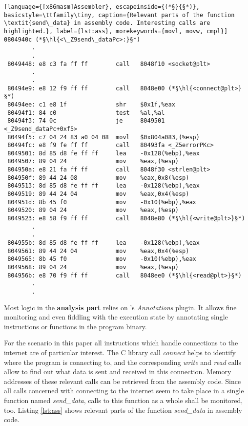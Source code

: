 \bigskip
\begin{lstlisting}[language={[x86masm]Assembler}, escapeinside={(*§}{§*)}, basicstyle=\ttfamily\tiny, caption={Relevant parts of the function \textit{send\_data} in assembly code. Interesting calls are highlighted.}, label={lst:ass}, morekeywords={movl, movw, cmpl}]
0804940c (*§\hl{<\_Z9send\_dataPc>:}§*)
 		.
 		.
 8049448: e8 c3 fa ff ff       	call   8048f10 <socket@plt>
		.
		.
 80494e9: e8 12 f9 ff ff       	call   8048e00 (*§\hl{<connect@plt>}§*)
 80494ee: c1 e8 1f             	shr    $0x1f,%eax
 80494f1: 84 c0                	test   %al,%al
 80494f3: 74 0c                	je     8049501						<_Z9send_dataPc+0xf5>
 80494f5: c7 04 24 83 a0 04 08 	movl   $0x804a083,(%esp)
 80494fc: e8 f9 fe ff ff       	call   80493fa <_Z5errorPKc>
 8049501: 8d 85 d8 fe ff ff    	lea    -0x128(%ebp),%eax
 8049507: 89 04 24             	mov    %eax,(%esp)
 804950a: e8 21 fa ff ff       	call   8048f30 <strlen@plt>
 804950f: 89 44 24 08          	mov    %eax,0x8(%esp)
 8049513: 8d 85 d8 fe ff ff    	lea    -0x128(%ebp),%eax
 8049519: 89 44 24 04          	mov    %eax,0x4(%esp)
 804951d: 8b 45 f0             	mov    -0x10(%ebp),%eax
 8049520: 89 04 24             	mov    %eax,(%esp)
 8049523: e8 58 f9 ff ff       	call   8048e80 (*§\hl{<write@plt>}§*)
		.
		.
 804955b: 8d 85 d8 fe ff ff    	lea    -0x128(%ebp),%eax
 8049561: 89 44 24 04          	mov    %eax,0x4(%esp)
 8049565: 8b 45 f0             	mov    -0x10(%ebp),%eax
 8049568: 89 04 24             	mov    %eax,(%esp)
 804956b: e8 70 f9 ff ff       	call   8048ee0 (*§\hl{<read@plt>}§*)
		.
		.
\end{lstlisting}
\bigskip

Most logic in the \textbf{analysis part} relies on \sse's \textit{Annotations} plugin.
It allows fine monitoring and even fiddling with the execution state by annotating single instructions or functions in the program binary.

For the scenario in this paper all instructions which handle connections to the internet are of particular interest.
The C library call \textit{connect} helps to identify where the program is connecting to, and the corresponding \textit{write} and \textit{read} calls allow to find out what data is sent and received in this connection.
Memory addresses of these relevant calls can be retrieved from the assembly code.
Since all calls concerned with connecting to the internet seem to take place in a single function named \textit{send\_data}, calls to this function as a whole shall be monitored, too.
Listing \ref{lst:ass} shows relevant parts of the function \textit{send\_data} in assembly code.


